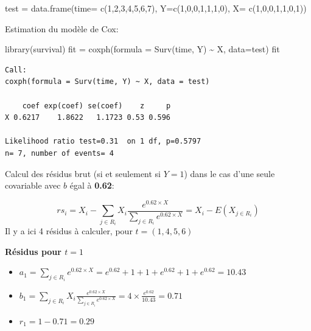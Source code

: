 \documentclass[
  12pt,
  letterpaper,
  DIV=11,
  numbers=noendperiod,
  onepage,
  openany]{scrreprt}
\newenvironment{Shaded}{\begin{snugshade}}{\end{snugshade}}
\newcommand{\AttributeTok}[1]{\textcolor[rgb]{0.80,0.80,0.80}{#1}}
\newcommand{\DecValTok}[1]{\textcolor[rgb]{0.86,0.86,0.80}{#1}}
\newcommand{\FunctionTok}[1]{\textcolor[rgb]{0.94,0.94,0.56}{#1}}
\newcommand{\NormalTok}[1]{\textcolor[rgb]{0.80,0.80,0.80}{#1}}
\newcommand{\OtherTok}[1]{\textcolor[rgb]{0.94,0.94,0.56}{#1}}
\newcommand{\SpecialCharTok}[1]{\textcolor[rgb]{0.86,0.64,0.64}{#1}}
\providecommand{\tightlist}{%
  \setlength{\itemsep}{0pt}\setlength{\parskip}{0pt}}\usepackage{longtable,booktabs,array}
\begin{document}
\begin{Shaded}
\begin{Highlighting}[]
\NormalTok{test }\OtherTok{=} \FunctionTok{data.frame}\NormalTok{(}\AttributeTok{time=}  \FunctionTok{c}\NormalTok{(}\DecValTok{1}\NormalTok{,}\DecValTok{2}\NormalTok{,}\DecValTok{3}\NormalTok{,}\DecValTok{4}\NormalTok{,}\DecValTok{5}\NormalTok{,}\DecValTok{6}\NormalTok{,}\DecValTok{7}\NormalTok{),}
                    \AttributeTok{Y=}\FunctionTok{c}\NormalTok{(}\DecValTok{1}\NormalTok{,}\DecValTok{0}\NormalTok{,}\DecValTok{0}\NormalTok{,}\DecValTok{1}\NormalTok{,}\DecValTok{1}\NormalTok{,}\DecValTok{1}\NormalTok{,}\DecValTok{0}\NormalTok{),}
                    \AttributeTok{X=}     \FunctionTok{c}\NormalTok{(}\DecValTok{1}\NormalTok{,}\DecValTok{0}\NormalTok{,}\DecValTok{0}\NormalTok{,}\DecValTok{1}\NormalTok{,}\DecValTok{1}\NormalTok{,}\DecValTok{0}\NormalTok{,}\DecValTok{1}\NormalTok{))}
\end{Highlighting}
\end{Shaded}

Estimation du modèle de Cox:

\begin{Shaded}
\begin{Highlighting}[]
\FunctionTok{library}\NormalTok{(survival)}
\NormalTok{fit }\OtherTok{=} \FunctionTok{coxph}\NormalTok{(}\AttributeTok{formula =} \FunctionTok{Surv}\NormalTok{(time, Y) }\SpecialCharTok{\textasciitilde{}}\NormalTok{ X, }\AttributeTok{data=}\NormalTok{test)}
\NormalTok{fit}
\end{Highlighting}
\end{Shaded}

\begin{verbatim}
Call:
coxph(formula = Surv(time, Y) ~ X, data = test)

    coef exp(coef) se(coef)    z     p
X 0.6217    1.8622   1.1723 0.53 0.596

Likelihood ratio test=0.31  on 1 df, p=0.5797
n= 7, number of events= 4 
\end{verbatim}

Calcul des résidus brut (si et seulement si \(Y=1\)) dans le cas d'une
seule covariable avec \(b\) égal à \textbf{0.62}:

\[rs_{i}=X_{i}- \sum_{j\in R_i}X_{i}\frac{e^{0.62\times X}}{\sum_{j\in R_i}e^{0.62\times X}}= X_{i} - E(X_{j\in R_i})\]
Il y a ici 4 résidus à calculer, pour \(t=(1,4,5,6)\)

\textbf{Résidus pour \(t=1\)}

\begin{itemize}
\tightlist
\item
  \(a_1= \sum_{j\in R_i}e^{0.62\times X} = e^{0.62} + 1 + 1 + e^{0.62} + 1 + e^{0.62}= 10.43\)
\item
  \(b_1= \sum_{j\in R_i}X_{i}\frac{e^{0.62\times X}}{\sum_{j\in R_i}e^{0.62\times X}} = 4\times\frac{e^{0.62}}{10.43} = 0.71\)
\item
  \(r_1 = 1 - 0.71 = 0.29\)
\end{itemize}
\end{document}
